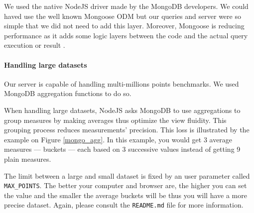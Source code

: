 \documentclass[a4paper,11pt]{report}
\begin{document}
We used the native NodeJS driver made by the MongoDB developers. We could haved use the well known Mongoose ODM but our queries and server were so simple that we did not need to add this layer. Moreover, Mongoose is reducing performance as it adds some logic layers between the code and the actual query execution or result \cite{mongo}.

\paragraph{Handling large datasets}\label{server:handling_large_dataset}

Our server is capable of handling multi-millions points benchmarks. We used MongoDB aggregation functions to do so.

When handling large datasets, NodeJS asks MongoDB to use aggregations to group measures by making averages thus optimize the view fluidity. This grouping process reduces measurements' precision. This loss is illustrated by the example on Figure \ref{mongo_agg}. In this example, you would get 3 average measures --- buckets --- each based on 3 successive values instead of getting 9 plain measures.

The limit between a large and small dataset is fixed by an user parameter called \texttt{MAX\_POINTS}. The better your computer and browser are, the higher you can set the value and the smaller the average buckets will be thus you will have a more precise dataset. Again, please consult the \texttt{README.md} file for more information.
\end{document}

